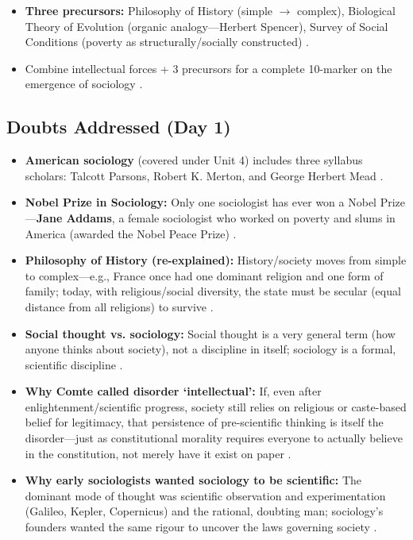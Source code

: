 \begin{QuickRevision}
\begin{itemize}
    \item \textbf{Three precursors:} Philosophy of History (simple $\rightarrow$ complex), Biological Theory of Evolution (organic analogy---Herbert Spencer), Survey of Social Conditions (poverty as structurally/socially constructed) .
    \item Combine intellectual forces + 3 precursors for a complete 10-marker on the emergence of sociology .
\end{itemize}
\end{QuickRevision}

\subsection{Doubts Addressed (Day 1)}

\begin{DataFact}
\begin{itemize}
    \item \textbf{American sociology} (covered under Unit 4) includes three syllabus scholars: Talcott Parsons, Robert K. Merton, and George Herbert Mead .
    \item \textbf{Nobel Prize in Sociology:} Only one sociologist has ever won a Nobel Prize---\textbf{Jane Addams}, a female sociologist who worked on poverty and slums in America (awarded the Nobel Peace Prize) .
\end{itemize}
\end{DataFact}

\begin{itemize}
    \item \textbf{Philosophy of History (re-explained):} History/society moves from simple to complex---e.g., France once had one dominant religion and one form of family; today, with religious/social diversity, the state must be secular (equal distance from all religions) to survive .
    \item \textbf{Social thought vs. sociology:} Social thought is a very general term (how anyone thinks about society), not a discipline in itself; sociology is a formal, scientific discipline .
    \item \textbf{Why Comte called disorder `intellectual':} If, even after enlightenment/scientific progress, society still relies on religious or caste-based belief for legitimacy, that persistence of pre-scientific thinking is itself the disorder---just as constitutional morality requires everyone to actually believe in the constitution, not merely have it exist on paper .
    \item \textbf{Why early sociologists wanted sociology to be scientific:} The dominant mode of thought was scientific observation and experimentation (Galileo, Kepler, Copernicus) and the rational, doubting man; sociology's founders wanted the same rigour to uncover the laws governing society .
\end{itemize}


